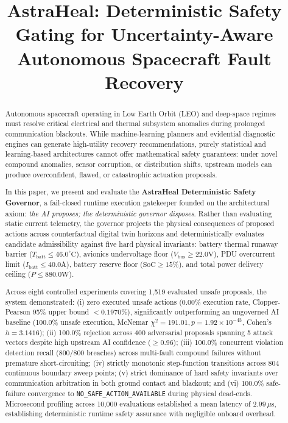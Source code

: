 \documentclass[conference]{IEEEtran}
\title{AstraHeal: Deterministic Safety Gating for Uncertainty-Aware Autonomous Spacecraft Fault Recovery}
\author{
\IEEEauthorblockN{Madan Thambisetty}
\IEEEauthorblockA{
Autonomous Systems \& Aerospace Software Research\\
AstraHeal Paper 3 --- Formal Scientific Research Series\\
Repository: \url{https://github.com/madankalyan2211/AstraHeal}
}
}
\begin{document}
\setlength{\parindent}{0pt}
\setlength{\parskip}{3.5pt plus 1pt minus 1pt}

\maketitle

\begin{abstract}
\setlength{\parindent}{0pt}
\setlength{\parskip}{3.5pt}
Autonomous spacecraft operating in Low Earth Orbit (LEO) and deep-space regimes must resolve critical electrical and thermal subsystem anomalies during prolonged communication blackouts. While machine-learning planners and evidential diagnostic engines can generate high-utility recovery recommendations, purely statistical and learning-based architectures cannot offer mathematical safety guarantees: under novel compound anomalies, sensor corruption, or distribution shifts, upstream models can produce overconfident, flawed, or catastrophic actuation proposals.

In this paper, we present and evaluate the \textbf{AstraHeal Deterministic Safety Governor}, a fail-closed runtime execution gatekeeper founded on the architectural axiom: \textit{the AI proposes; the deterministic governor disposes}. Rather than evaluating static current telemetry, the governor projects the physical consequences of proposed actions across counterfactual digital twin horizons and deterministically evaluates candidate admissibility against five hard physical invariants: battery thermal runaway barrier ($T_{\text{batt}} \le 46.0^\circ\text{C}$), avionics undervoltage floor ($V_{\text{bus}} \ge 22.0\text{V}$), PDU overcurrent limit ($I_{\text{batt}} \le 40.0\text{A}$), battery reserve floor ($\text{SoC} \ge 15\%$), and total power delivery ceiling ($P \le 880.0\text{W}$).

Across eight controlled experiments covering 1,519 evaluated unsafe proposals, the system demonstrated: (i) zero executed unsafe actions ($0.00\%$ execution rate, Clopper-Pearson 95\% upper bound $< 0.1970\%$), significantly outperforming an ungoverned AI baseline (100.0\% unsafe execution, McNemar $\chi^2 = 191.01, p = 1.92 \times 10^{-43}$, Cohen's $h = 3.1416$); (ii) 100.0\% rejection across 400 adversarial proposals spanning 5 attack vectors despite high upstream AI confidence ($\ge 0.96$); (iii) 100.0\% concurrent violation detection recall (800/800 breaches) across multi-fault compound failures without premature short-circuiting; (iv) strictly monotonic step-function transitions across 804 continuous boundary sweep points; (v) strict dominance of hard safety invariants over communication arbitration in both ground contact and blackout; and (vi) 100.0\% safe-failure convergence to \texttt{NO\_SAFE\_ACTION\_AVAILABLE} during physical dead-ends. Microsecond profiling across 10,000 evaluations established a mean latency of $2.99\,\mu\text{s}$, establishing deterministic runtime safety assurance with negligible onboard overhead.
\end{abstract}
\end{document}
